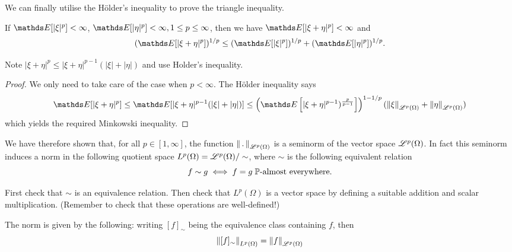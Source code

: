 \begin{unexaminable}
We can finally utilise the Hölder's inequality to prove the triangle inequality.

\begin{proposition}
If $\E[|\xi|^p] < \infty$, $\E[|\eta|^p] < \infty, 1\le p \le \infty$, then we have $\E[|\xi + \eta|^p]<\infty$ and 
\begin{equation*}
    (\E[|\xi + \eta|^p])^{1/p} \le (\E[|\xi|^p])^{1/p} + (\E[|\eta|^p])^{1/p}.
\end{equation*}
\end{proposition}

\begin{hint}
Note $|\xi + \eta|^p \leq |\xi + \eta|^{p-1}(|\xi| + |\eta|)$ and use Holder's inequality.
\end{hint}

\begin{proof}
We only need to take care of the case when $p<\infty$. The Hölder inequality says
\begin{equation}
    \E[|\xi + \eta|^p] \leq \E[|\xi + \eta|^{p-1} (|\xi| + |\eta|)] \leq \left(\E\sqbracket{|\xi + \eta|^{p-1})^{\frac{p}{p-1}}}\right)^{1-1/p} (\norm{\xi}_{\L^p(\Omega)} + \norm{\eta}_{\L^p(\Omega)})
\end{equation}
which yields the required Minkowski inequality.
\end{proof}
\end{unexaminable}

We have therefore shown that, for all $p \in [1,\infty]$, the function $\left\| \,.\, \right\|_{\mathcal{L}^p(\Omega)}$ is a seminorm of the vector space $\mathcal{L}^p(\Omega)$. In fact this seminorm induces a norm in the following quotient space $L^p(\Omega) = \mathcal{L}^p(\Omega) / \sim$, where $\sim$ is the following equivalent relation
\begin{equation} \label{eq:equiv_relation_Lp}
    f \sim g \iff f = g \; \mathbb{P}\text{-almost everywhere.} 
\end{equation}

\begin{unexaminable}
\begin{exercise}
First check that $\sim$ is an equivalence relation. Then check that $L^p(\Omega)$ is a vector space by defining a suitable addition and scalar multiplication. (Remember to check that these operations are well-defined!)
\end{exercise}
\end{unexaminable}

The norm is given by the following: writing $[f]_\sim$ being the equivalence class containing $f$, then
\begin{equation}
    \left\| [f]_\sim \right\|_{L^p(\Omega)} = \left\| f \right\|_{\mathcal{L}^p(\Omega)}
\end{equation}

